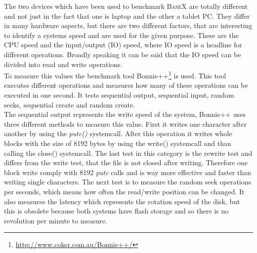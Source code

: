 The two devices which have been used to benchmark \textsc{BaseX} are totally different and not just in the fact that one is laptop and the other a tablet PC.
They differ in many hardware aspects, but there are two different factors, that are interesting to identify a systems speed and are used for the given purpose.
These are the CPU speed and the input/output (IO) speed, where IO speed is a headline for different operations.
Broadly speaking it can be said that the IO speed can be divided into read and write operations.\\
To measure this values the benchmark tool Bonnie++\footnote{\url{http://www.coker.com.au/Bonnie++/}} is used.
This tool executes different operations and measures how many of these operations can be executed in one second.
It tests sequential output, sequential input, random seeks, sequential create and random create.\\
The sequential output represents the write speed of the system, Bonnie++ uses three different methods to measure this value.
First it writes one character after another by using the \textit{putc()} systemcall. 
After this operation it writes whole blocks with the size of 8192 bytes by using the write() systemcall and than calling the close() systemcall.
The last test in this category is the rewrite test and differs from the write test, that the file is not closed after writing.
Therefore one block write comply with 8192 \textit{putc} calls and is way more effective and faster than writing single characters.
The next test is to measure the random seek operations per seconds, which means how often the read/write position can be changed.
It also measures the latency which represents the rotation speed of the disk, but this is obsolete because both systems have flash storage and so there is no revolution per minute to measure.
